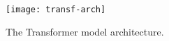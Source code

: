 \begin{figure}[h]
    \centering
    \texttt{[image: transf-arch]}
    \caption{The Transformer model architecture. \cite{Att.2017}}
    \label{fig:transf-arch}
    \end{figure}




    


